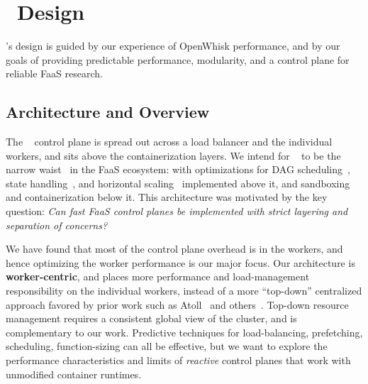 \section{\sysname~Design}
\label{sec:design}


\sysname's design is guided by our experience of OpenWhisk performance, and by our goals of providing predictable performance, modularity, and a control plane for reliable FaaS research.

\subsection{Architecture and Overview}
\label{sec:design:arch}

The \sysname~ control plane is spread out across a load balancer and the individual workers, and sits above the containerization layers. 
We intend for \sysname~ to be the narrow waist~\cite{popa_http_2010} in the FaaS ecosystem: with optimizations for DAG scheduling~\cite{zhou_qos-aware_2022}, state handling~\cite{sreekanti2020cloudburst}, and horizontal scaling~\cite{faaslb-hpdc22} implemented above it, and sandboxing and containerization below it.  
This architecture was motivated by the key question: \emph{Can fast FaaS control planes be implemented with strict layering and separation of concerns?}


We have found that most of the control plane overhead is in the workers, and hence optimizing the worker performance is our major focus.
%
Our architecture is \textbf{worker-centric}, and places more performance and load-management responsibility on the individual workers, instead of a more ``top-down'' centralized approach favored by prior work such as Atoll~\cite{singhvi2021atoll} and others~\cite{kaffes_centralized_2019, kaffes_hermod_2022}.
Top-down resource management requires a consistent global view of the cluster, and is complementary to our work. 
Predictive techniques for load-balancing, prefetching, scheduling, function-sizing can all be effective, but we want to explore the performance characteristics and limits of \emph{reactive} control planes that work with unmodified container runtimes. 

